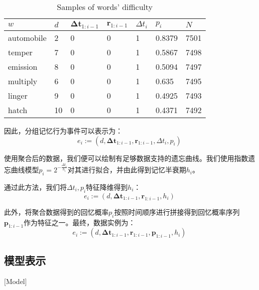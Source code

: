 \begin{table}[htbp]
    \caption{Samples of words' difficulty}
    \label{tab:difficulty}
    \vspace{0.5em}\centering\wuhao
    \begin{tabular}{lllllll}
    \toprule[1.5pt]
    $w$          & $d$  & $\boldsymbol{\Delta t}_{1:i-1}$ & $\boldsymbol r_{1:i-1}$& $\Delta t_i$ & $p_i$& $N$ \\ 
    \midrule[1pt]
    automobile & 2  & 0          & 0          & 1        & 0.8379    & 7501       \\
    temper     & 7  & 0          & 0          & 1        & 0.5867    & 7498       \\
    emission   & 8  & 0          & 0          & 1        & 0.5094    & 7497       \\
    multiply   & 6  & 0          & 0          & 1        & 0.635     & 7495       \\
    linger     & 9  & 0          & 0          & 1        & 0.4925    & 7493       \\
    hatch      & 10 & 0          & 0          & 1        & 0.4371    & 7492       \\ 
    \bottomrule[1.5pt]
    \end{tabular}
\end{table}

因此，分组记忆行为事件可以表示为：
\begin{equation}
e_{i} :=(d, \boldsymbol{\Delta t}_{1:i-1}, \boldsymbol r_{1:i-1}, \Delta t_i , p_i)
\end{equation}

使用聚合后的数据，我们便可以绘制有足够数据支持的遗忘曲线。我们使用指数遗忘曲线模型$p_i = 2^{-\frac{\Delta t_i}{h_i}}$对其进行拟合，并由此得到记忆半衰期$h_i$。

通过此方法，我们将$\Delta t_i , p_i$特征降维得到$h_i$：
\begin{equation}
e_{i} :=(d, \boldsymbol{\Delta t}_{1:i-1}, \boldsymbol r_{1:i-1}, h_i)
\end{equation}

此外，将聚合数据得到的回忆概率$p_i$按照时间顺序进行拼接得到回忆概率序列 $\boldsymbol p_{1:i-1}$作为特征之一。最终，数据实例为：
\begin{equation}
e_{i}:=(d, \boldsymbol{\Delta t}_{1:i-1}, \boldsymbol r_{1:i-1}, \boldsymbol p_{1:i-1}, h_i)
\end{equation}

\subsection{模型表示}[Model]\label{sec:LSTM}

